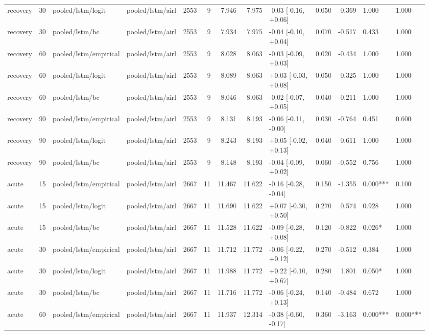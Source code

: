 \begin{tabular}{lrllrrrrlrrll}
recovery & 30 & pooled/lstm/logit & pooled/lstm/airl & 2553 & 9 & 7.946 & 7.975 & -0.03 [-0.16, +0.06] & 0.050 & -0.369 & 1.000 & 1.000 \\
recovery & 30 & pooled/lstm/bc & pooled/lstm/airl & 2553 & 9 & 7.934 & 7.975 & -0.04 [-0.10, +0.04] & 0.070 & -0.517 & 0.433 & 1.000 \\
recovery & 60 & pooled/lstm/empirical & pooled/lstm/airl & 2553 & 9 & 8.028 & 8.063 & -0.03 [-0.09, +0.03] & 0.020 & -0.434 & 1.000 & 1.000 \\
recovery & 60 & pooled/lstm/logit & pooled/lstm/airl & 2553 & 9 & 8.089 & 8.063 & +0.03 [-0.03, +0.08] & 0.050 & 0.325 & 1.000 & 1.000 \\
recovery & 60 & pooled/lstm/bc & pooled/lstm/airl & 2553 & 9 & 8.046 & 8.063 & -0.02 [-0.07, +0.05] & 0.040 & -0.211 & 1.000 & 1.000 \\
recovery & 90 & pooled/lstm/empirical & pooled/lstm/airl & 2553 & 9 & 8.131 & 8.193 & -0.06 [-0.11, -0.00] & 0.030 & -0.764 & 0.451 & 0.600 \\
recovery & 90 & pooled/lstm/logit & pooled/lstm/airl & 2553 & 9 & 8.243 & 8.193 & +0.05 [-0.02, +0.13] & 0.040 & 0.611 & 1.000 & 1.000 \\
recovery & 90 & pooled/lstm/bc & pooled/lstm/airl & 2553 & 9 & 8.148 & 8.193 & -0.04 [-0.09, +0.02] & 0.060 & -0.552 & 0.756 & 1.000 \\
acute & 15 & pooled/lstm/empirical & pooled/lstm/airl & 2667 & 11 & 11.467 & 11.622 & -0.16 [-0.28, -0.04] & 0.150 & -1.355 & 0.000*** & 0.100 \\
acute & 15 & pooled/lstm/logit & pooled/lstm/airl & 2667 & 11 & 11.690 & 11.622 & +0.07 [-0.30, +0.50] & 0.270 & 0.574 & 0.928 & 1.000 \\
acute & 15 & pooled/lstm/bc & pooled/lstm/airl & 2667 & 11 & 11.528 & 11.622 & -0.09 [-0.28, +0.08] & 0.120 & -0.822 & 0.026* & 1.000 \\
acute & 30 & pooled/lstm/empirical & pooled/lstm/airl & 2667 & 11 & 11.712 & 11.772 & -0.06 [-0.22, +0.12] & 0.270 & -0.512 & 0.384 & 1.000 \\
acute & 30 & pooled/lstm/logit & pooled/lstm/airl & 2667 & 11 & 11.988 & 11.772 & +0.22 [-0.10, +0.67] & 0.280 & 1.801 & 0.050* & 1.000 \\
acute & 30 & pooled/lstm/bc & pooled/lstm/airl & 2667 & 11 & 11.716 & 11.772 & -0.06 [-0.24, +0.13] & 0.140 & -0.484 & 0.672 & 1.000 \\
acute & 60 & pooled/lstm/empirical & pooled/lstm/airl & 2667 & 11 & 11.937 & 12.314 & -0.38 [-0.60, -0.17] & 0.360 & -3.163 & 0.000*** & 0.000*** \\

\end{tabular}
